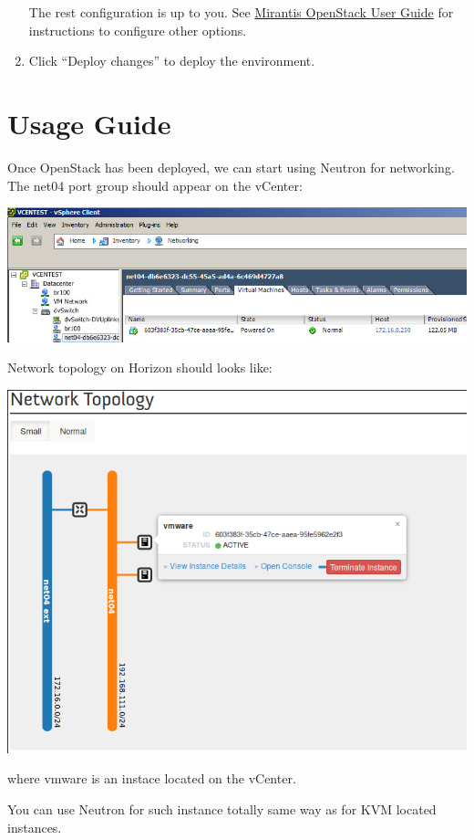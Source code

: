 \documentclass{article}
\begin{document}
\begin{enumerate}
The rest configuration is up to you. See \href{https://docs.mirantis.com/openstack/fuel/fuel-6.1/user-guide.html}{Mirantis OpenStack User Guide} for instructions to configure other options.

\item Click ``Deploy changes'' to deploy the environment.

\end{enumerate}

\section{Usage Guide}

Once OpenStack has been deployed, we can start using Neutron for networking. The net04 port group should appear on the vCenter:

\includegraphics[scale=0.8]{pics/net04pg}

\newpage

Network topology on Horizon should looks like:

\includegraphics[scale=0.8]{pics/topology}

where vmware is an instace located on the vCenter.

You can use Neutron for such instance totally same way as for KVM located instances.
\end{document}
